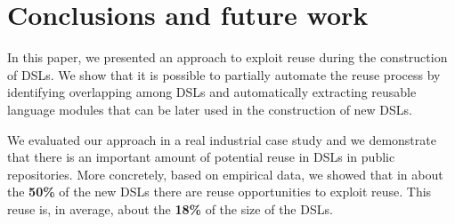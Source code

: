 \section{Conclusions and future work}
\label{sec:conclusions}
In this paper, we presented an approach to exploit reuse during the construction of DSLs. We show that it is possible to partially automate the reuse process by identifying overlapping among DSLs and automatically extracting reusable language modules that can be later used in the construction of new DSLs.

We evaluated our approach in a real industrial case study and we demonstrate that there is an important amount of potential reuse in DSLs in public repositories. More concretely, based on empirical data, we showed that in about the \textbf{50\%} of the new DSLs there are reuse opportunities to exploit reuse. This reuse is, in average, about the \textbf{18\%} of the size of the DSLs. 

